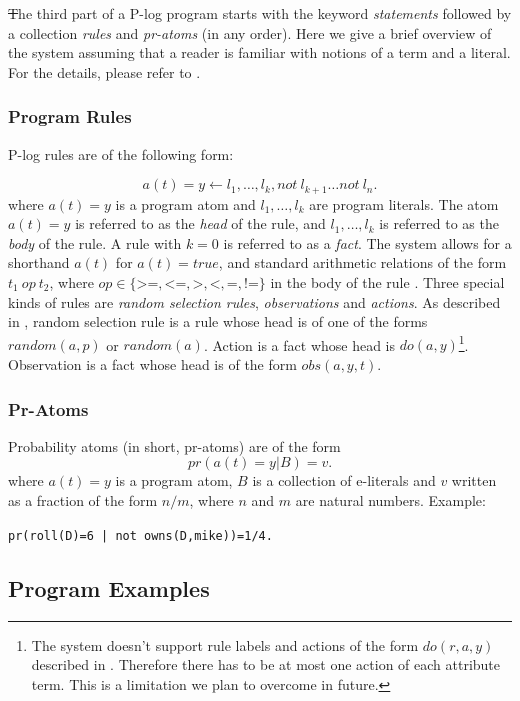 \documentclass[12pt, letterpaper]{article}
\begin{document}
\st The third part of a P-log program starts with the keyword \textit{statements} followed by a collection \textit{rules} and \textit{pr-atoms} (in any order). Here we give a brief overview of the system assuming that a reader is familiar with notions of a term and a literal. For the details, please refer to \cite{Balai2019}. 

\subsubsection{Program Rules}
P-log rules are of the following form:

\begin{equation}
   a(t) = y \leftarrow l_1,  \ldots, l_k, not~l_{k+1} \ldots not~l_{n}.
 \end{equation}
where $a(t) = y$ is a program atom and $l_1,\ldots,l_k$ are program literals.
The atom $a(t) = y$ is referred to as the \textit{head} of the rule, and $l_1,\ldots,l_k$ is referred to as the \textit{body} of the rule.
 A rule with $k=0$ is referred to as a \textit{fact}.
 The system allows for a shorthand $a(t)$ for $a(t) = true$, and standard arithmetic relations of the form $t_1~op~t_2$, where $op \in \{\texttt{>=},\texttt{<=},\texttt{>},\texttt{<},\texttt{=},\texttt{!=}\}$ in the body of the rule .
 Three special kinds of rules are \textit{random selection rules}, \textit{observations} and \textit{actions}.
 As described in \cite{Balai2019},
 random selection rule is a rule whose head is of one of the forms $random(a,p)$ or $random(a)$. Action is a fact whose head is $do(a,y)$\footnote{The system doesn't support rule labels and actions of the form $do(r,a,y)$ described in \cite{Balai2019}. Therefore there has to be at most one action of each attribute term. This is a limitation we plan to overcome in future.}.
 Observation is a fact whose head is of the form $obs(a,y,t)$.

 \subsubsection{Pr-Atoms}

 Probability atoms (in short, pr-atoms) are of the form 
 $$pr(a(t) = y | B) = v.$$
 where $a(t) = y$ is a program atom, $B$ is a collection of e-literals and $v$  written as a fraction of the form $n/m$, where $n$ and $m$ are natural numbers.  Example:
\begin{center}
 \texttt{pr(roll(D)=6 | not owns(D,mike))=1/4.}
\end{center}
 \subsection{Program Examples}
\end{document}
